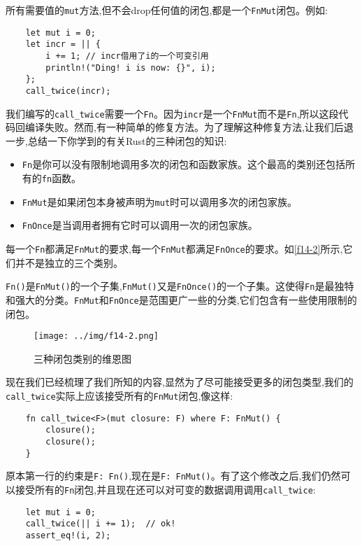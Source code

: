 所有需要值的\texttt{mut}方法,但不会drop任何值的闭包,都是一个\texttt{FnMut}闭包。例如:
\begin{verbatim}
    let mut i = 0;
    let incr = || {
        i += 1; // incr借用了i的一个可变引用
        println!("Ding! i is now: {}", i);
    };
    call_twice(incr);
\end{verbatim}

我们编写的\texttt{call\_twice}需要一个\texttt{Fn}。因为\texttt{incr}是一个\texttt{FnMut}而不是\texttt{Fn},所以这段代码回编译失败。然而,有一种简单的修复方法。为了理解这种修复方法,让我们后退一步,总结一下你学到的有关Rust的三种闭包的知识:
\begin{itemize}
    \item \texttt{Fn}是你可以没有限制地调用多次的闭包和函数家族。这个最高的类别还包括所有的\texttt{fn}函数。
    \item \texttt{FnMut}是如果闭包本身被声明为\texttt{mut}时可以调用多次的闭包家族。
    \item \texttt{FnOnce}是当调用者拥有它时可以调用一次的闭包家族。
\end{itemize}

每一个\texttt{Fn}都满足\texttt{FnMut}的要求,每一个\texttt{FnMut}都满足\texttt{FnOnce}的要求。如\autoref{f14-2}所示,它们并不是独立的三个类别。

\texttt{Fn()}是\texttt{FnMut()}的一个子集,\texttt{FnMut()}又是\texttt{FnOnce()}的一个子集。这使得\texttt{Fn}是最独特和强大的分类。\texttt{FnMut}和\texttt{FnOnce}是范围更广一些的分类,它们包含有一些使用限制的闭包。

\begin{figure}[htbp]
    \centering
    \texttt{[image: ../img/f14-2.png]}
    \caption{三种闭包类别的维恩图}
    \label{f14-2}
\end{figure}

现在我们已经梳理了我们所知的内容,显然为了尽可能接受更多的闭包类型,我们的\texttt{call\_twice}实际上应该接受所有的\texttt{FnMut}闭包,像这样:
\begin{verbatim}
    fn call_twice<F>(mut closure: F) where F: FnMut() {
        closure();
        closure();
    }
\end{verbatim}

原本第一行的约束是\texttt{F: Fn()},现在是\texttt{F: FnMut()}。有了这个修改之后,我们仍然可以接受所有的\texttt{Fn}闭包,并且现在还可以对可变的数据调用调用\texttt{call\_twice}:
\begin{verbatim}
    let mut i = 0;
    call_twice(|| i += 1);  // ok!
    assert_eq!(i, 2);
\end{verbatim}


